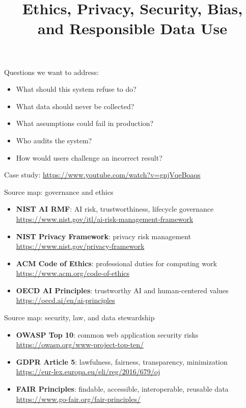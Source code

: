 \documentclass[aspectratio=43,12pt]{beamer}
\title{Ethics, Privacy, Security, Bias,\\and Responsible Data Use}
\author{}
\date{
\color{aggiemaroon}{
DAEN 459 - Fall 2026\\
\textbf{Alexander Abuabara}
}}
\begin{document}
\frame{\titlepage}

\begin{frame}{Questions we want to address:}
\begin{itemize}
  \item What should this system refuse to do?
  \item What data should never be collected?
  \item What assumptions could fail in production?
  \item Who audits the system?
  \item How would users challenge an incorrect result?
\end{itemize}
\end{frame}

\begin{frame}
Case study:
\url{https://www.youtube.com/watch?v=gnjVqeBoaqs}
\end{frame}

\begin{frame}{Source map: governance and ethics}
\begin{itemize}
  \item \textbf{NIST AI RMF}: AI risk, trustworthiness, lifecycle governance\\
  \url{https://www.nist.gov/itl/ai-risk-management-framework}
  \item \textbf{NIST Privacy Framework}: privacy risk management\\
  \url{https://www.nist.gov/privacy-framework}
  \item \textbf{ACM Code of Ethics}: professional duties for computing work\\
  \url{https://www.acm.org/code-of-ethics}
  \item \textbf{OECD AI Principles}: trustworthy AI and human-centered values\\
  \url{https://oecd.ai/en/ai-principles}
\end{itemize}
\end{frame}

\begin{frame}{Source map: security, law, and data stewardship}
\begin{itemize}
  \item \textbf{OWASP Top 10}: common web application security risks\\
  \url{https://owasp.org/www-project-top-ten/}
  \item \textbf{GDPR Article 5}: lawfulness, fairness, transparency, minimization\\
  \url{https://eur-lex.europa.eu/eli/reg/2016/679/oj}
  \item \textbf{FAIR Principles}: findable, accessible, interoperable, reusable data\\
  \url{https://www.go-fair.org/fair-principles/}
\end{itemize}
\end{frame}
\end{document}
